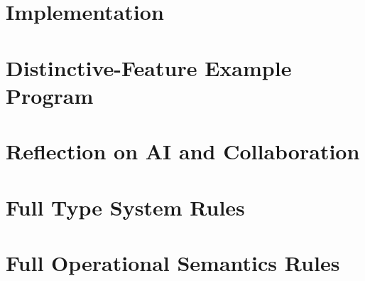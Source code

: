 \documentclass[11pt,a4paper]{article}
\begin{document}
\section{Implementation}


\section{Distinctive-Feature Example Program}


\section{Reflection on AI and Collaboration}


\appendix

\section{Full Type System Rules}


\section{Full Operational Semantics Rules}


\end{document}
